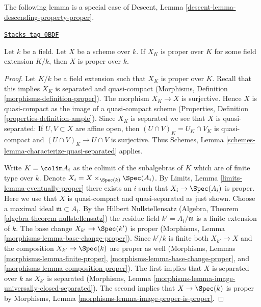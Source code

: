 The following lemma is a special case of
Descent, Lemma \ref{descent-lemma-descending-property-proper}.

\begin{lemma}
\label{varieties-lemma-proper-after-field-extension}
\href{https://stacks.math.columbia.edu/tag/0BDF}{\texttt{Stacks tag 0BDF}}

Let $k$ be a field. Let $X$ be a scheme over $k$. If $X_K$ is proper
over $K$ for some field extension $K/k$, then $X$ is proper
over $k$.
\end{lemma}

\begin{proof}
Let $K/k$ be a field extension such that $X_K$ is proper over $K$.
Recall that this implies $X_K$ is separated and quasi-compact
(Morphisms, Definition \ref{morphisms-definition-proper}).
The morphism $X_K \to X$ is surjective. Hence $X$ is quasi-compact
as the image of a quasi-compact scheme (Properties, Definition
\ref{properties-definition-ample}). Since $X_K$ is separated
we see that $X$ is quasi-separated: If $U, V \subset X$ are
affine open, then $(U \cap V)_K = U_K \cap V_K$ is quasi-compact
and $(U \cap V)_K \to U \cap V$ is surjective. Thus
Schemes, Lemma \ref{schemes-lemma-characterize-quasi-separated} applies.

\medskip\noindent
Write $K = \colim A_i$ as the colimit of the subalgebras of $K$
which are of finite type over $k$. Denote
$X_i = X \times_{\Spec(k)} \Spec(A_i)$.
By Limits, Lemma \ref{limits-lemma-eventually-proper}
there exists an $i$ such that $X_i \to \Spec(A_i)$ is proper.
Here we use that $X$ is quasi-compact and quasi-separated as
just shown. Choose a maximal ideal $\mathfrak m \subset A_i$.
By the Hilbert Nullstellensatz
(Algebra, Theorem \ref{algebra-theorem-nullstellensatz})
the residue field $k' = A_i/\mathfrak m$ is a finite
extension of $k$.  The base change $X_{k'} \to \Spec(k')$
is proper (Morphisms, Lemma \ref{morphisms-lemma-base-change-proper}).
Since $k'/k$ is finite both $X_{k'} \to X$ and the composition
$X_{k'} \to \Spec(k)$
are proper as well (Morphisms, Lemmas \ref{morphisms-lemma-finite-proper},
\ref{morphisms-lemma-base-change-proper}, and
\ref{morphisms-lemma-composition-proper}).
The first implies that $X$ is separated over $k$ as $X_{k'}$
is separated
(Morphisms, Lemma \ref{morphisms-lemma-image-universally-closed-separated}).
The second implies that $X \to \Spec(k)$ is proper
by Morphisms, Lemma \ref{morphisms-lemma-image-proper-is-proper}.
\end{proof}

